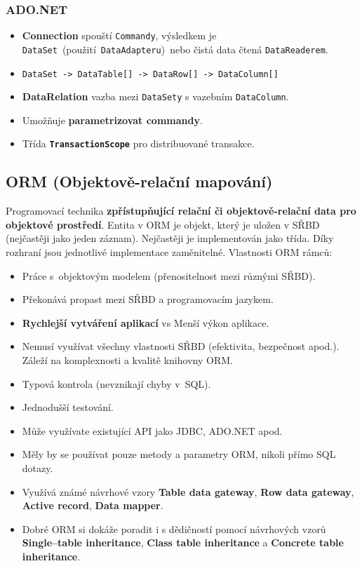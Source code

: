 \subsubsection{ADO.NET}
\begin{itemize}
\item \textbf{Connection} spouští \texttt{Commandy}, výsledkem je \texttt{DataSet} (použití \texttt{DataAdapteru}) nebo čistá data čtená \texttt{DataReaderem}.
\item \texttt{DataSet -> DataTable[] -> DataRow[] -> DataColumn[]}
\item \textbf{DataRelation} vazba mezi \texttt{DataSety} s vazebním \texttt{DataColumn}.
\item Umožňuje \textbf{parametrizovat commandy}.
\item Třída \textbf{\texttt{TransactionScope}} pro distribuované transakce.
\end{itemize}

\subsection{ORM (Objektově-relační mapování)}
Programovací technika \textbf{zpřístupňující relační či objektově-relační data pro objektové prostředí}. Entita v ORM je objekt, který je uložen v SŘBD (nejčastěji jako jeden záznam). Nejčastěji je implementován jako třída. Díky rozhraní jsou jednotlivé implementace zaměnitelné. Vlastnosti ORM rámců:
\begin{itemize} 
\item Práce s objektovým modelem (přenositelnost mezi různými SŘBD).
\item Překonává propast mezi SŘBD a programovacím jazykem.
\item \textbf{Rychlejší vytváření aplikací} vs Menší výkon aplikace.
\item Nemusí využívat všechny vlastnosti SŘBD (efektivita, bezpečnost apod.). Záleží na komplexnosti a kvalitě knihovny ORM.
\item Typová kontrola (nevznikají chyby v SQL).
\item Jednodušší testování.
\item Může využívate existující API jako JDBC, ADO.NET apod.
\item Měly by se používat pouze metody a parametry ORM, nikoli přímo SQL dotazy.
\item Využívá známé návrhové vzory \textbf{Table data gateway}, \textbf{Row data gateway}, \textbf{Active record}, \textbf{Data mapper}.
\item Dobré ORM si dokáže poradit i s dědičností pomocí návrhových vzorů \textbf{Single--table inheritance}, \textbf{Class table inheritance} a \textbf{Concrete table inheritance}.
\end{itemize}

